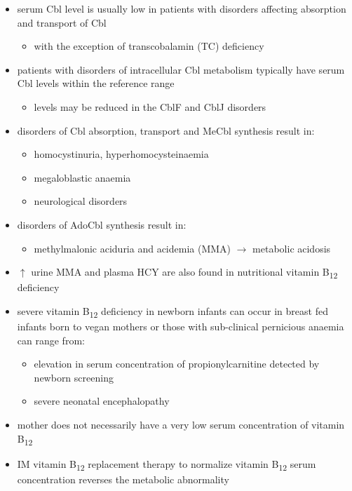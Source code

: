 \documentclass[12pt]{scrartcl}
\begin{document}
\begin{itemize}
\item serum Cbl level is usually low in patients with disorders affecting
absorption and transport of Cbl
\begin{itemize}
\item with the exception of transcobalamin (TC) deficiency
\end{itemize}
\item patients with disorders of intracellular Cbl metabolism typically
have serum Cbl levels within the reference range
\begin{itemize}
\item levels may be reduced in the CblF and CblJ disorders
\end{itemize}
\item disorders of Cbl absorption, transport and MeCbl synthesis result in:
\begin{itemize}
\item homocystinuria, hyperhomocysteinaemia
\item megaloblastic anaemia
\item neurological disorders
\end{itemize}
\item disorders of AdoCbl synthesis result in:
\begin{itemize}
\item methylmalonic aciduria and acidemia (MMA) \(\to\) metabolic
acidosis
\end{itemize}
\item \(\uparrow\) urine MMA and plasma HCY are also found in nutritional
vitamin B\textsubscript{12} deficiency
\item severe vitamin B\textsubscript{12} deficiency in newborn infants can occur in
breast fed infants born to vegan mothers or those with sub-clinical
pernicious anaemia can range from:
\begin{itemize}
\item elevation in serum concentration of propionylcarnitine detected by
newborn screening
\item severe neonatal encephalopathy
\end{itemize}
\item mother does not necessarily have a very low serum concentration of
vitamin B\textsubscript{12}
\item IM vitamin B\textsubscript{12} replacement therapy to normalize vitamin B\textsubscript{12} serum
concentration reverses the metabolic abnormality
\end{itemize}
\end{document}
